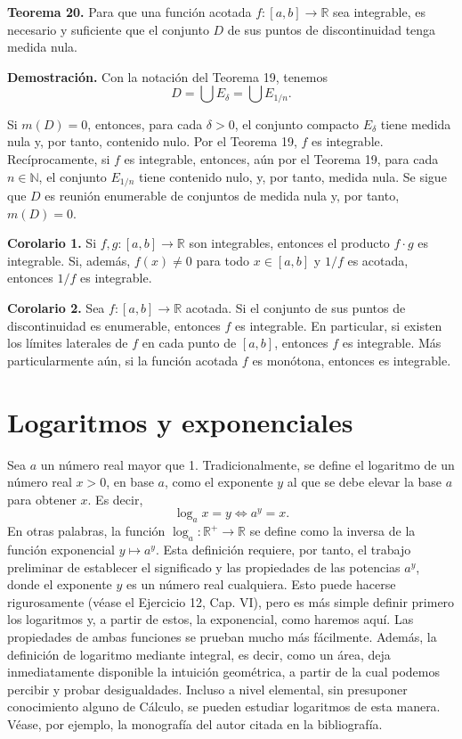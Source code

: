 \documentclass[12pt,oneside]{book}
\begin{document}
\textbf{Teorema 20.} Para que una función acotada \(f: [a, b] \to \mathbb{R}\) sea integrable, es necesario y suficiente que el conjunto \(D\) de sus puntos de discontinuidad tenga medida nula.

\textbf{Demostración.} Con la notación del Teorema 19, tenemos
\[
D = \bigcup E_\delta = \bigcup E_{1/n}.
\]

Si \(m(D) = 0\), entonces, para cada \(\delta > 0\), el conjunto compacto \(E_\delta\) tiene medida nula y, por tanto, contenido nulo. Por el Teorema 19, \(f\) es integrable. Recíprocamente, si \(f\) es integrable, entonces, aún por el Teorema 19, para cada \(n \in \mathbb{N}\), el conjunto \(E_{1/n}\) tiene contenido nulo, y, por tanto, medida nula. Se sigue que \(D\) es reunión enumerable de conjuntos de medida nula y, por tanto, \(m(D) = 0\).

\textbf{Corolario 1.} Si \(f, g: [a, b] \to \mathbb{R}\) son integrables, entonces el producto \(f \cdot g\) es integrable. Si, además, \(f(x) \neq 0\) para todo \(x \in [a, b]\) y \(1/f\) es acotada, entonces \(1/f\) es integrable.

\textbf{Corolario 2.} Sea \(f: [a, b] \to \mathbb{R}\) acotada. Si el conjunto de sus puntos de discontinuidad es enumerable, entonces \(f\) es integrable. En particular, si existen los límites laterales de \(f\) en cada punto de \([a, b]\), entonces \(f\) es integrable. Más particularmente aún, si la función acotada \(f\) es monótona, entonces es integrable.

\section{Logaritmos y exponenciales}

Sea \(a\) un número real mayor que 1. Tradicionalmente, se define el logaritmo de un número real \(x > 0\), en base \(a\), como el exponente \(y\) al que se debe elevar la base \(a\) para obtener \(x\). Es decir,
\[
\log_a x = y \iff a^y = x.
\]
En otras palabras, la función \(\log_a: \mathbb{R}^+ \to \mathbb{R}\) se define como la inversa de la función exponencial \(y \mapsto a^y\). Esta definición requiere, por tanto, el trabajo preliminar de establecer el significado y las propiedades de las potencias \(a^y\), donde el exponente \(y\) es un número real cualquiera. Esto puede hacerse rigurosamente (véase el Ejercicio 12, Cap. VI), pero es más simple definir primero los logaritmos y, a partir de estos, la exponencial, como haremos aquí. Las propiedades de ambas funciones se prueban mucho más fácilmente. Además, la definición de logaritmo mediante integral, es decir, como un área, deja inmediatamente disponible la intuición geométrica, a partir de la cual podemos percibir y probar desigualdades. Incluso a nivel elemental, sin presuponer conocimiento alguno de Cálculo, se pueden estudiar logaritmos de esta manera. Véase, por ejemplo, la monografía del autor citada en la bibliografía.
\end{document}

